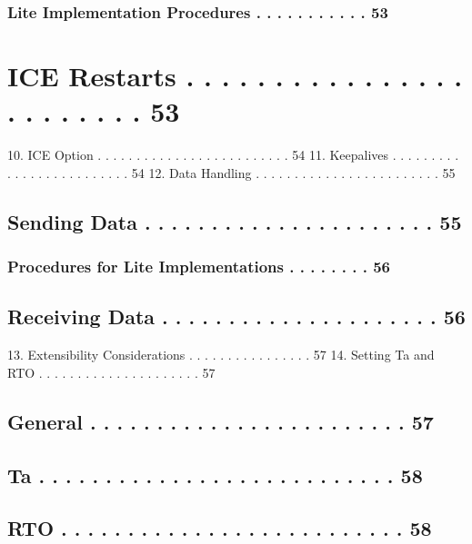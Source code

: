 \documentclass{article}
\begin{document}
\subsubsection{Lite Implementation Procedures  . . . . . . . . . . .  53}

\section{ICE Restarts  . . . . . . . . . . . . . . . . . . . . . . . .  53}

10. ICE Option  . . . . . . . . . . . . . . . . . . . . . . . . .  54 11. Keepalives  . . . . . . . . . . . . . . . . . . . . . . . . .  54 12. Data Handling . . . . . . . . . . . . . . . . . . . . . . . .  55

\subsection{Sending Data . . . . . . . . . . . . . . . . . . . . . .  55}

\subsubsection{Procedures for Lite Implementations  . . . . . . . .  56}

\subsection{Receiving Data . . . . . . . . . . . . . . . . . . . . .  56}

13. Extensibility Considerations  . . . . . . . . . . . . . . . .  57 14. Setting Ta and RTO  . . . . . . . . . . . . . . . . . . . . .  57

\subsection{General  . . . . . . . . . . . . . . . . . . . . . . . .  57}

\subsection{Ta . . . . . . . . . . . . . . . . . . . . . . . . . . .  58}

\subsection{RTO  . . . . . . . . . . . . . . . . . . . . . . . . . .  58}
\end{document}
